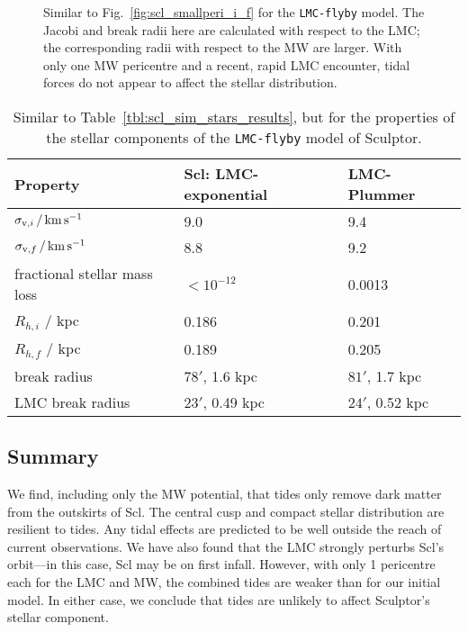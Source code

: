 \begin{figure}
\centering
{}
\caption[Sculptor initial and final density with LMC]{Similar to
Fig.~\ref{fig:scl_smallperi_i_f} for the \texttt{LMC-flyby} model. The
Jacobi and break radii here are calculated with respect to the LMC; the
corresponding radii with respect to the MW are larger. With only one MW
pericentre and a recent, rapid LMC encounter, tidal forces do not appear
to affect the stellar distribution.}\label{fig:scl_lmc_i_f}
\end{figure}

\begin{table*}[t]
\centering
\caption[Simulation results for Sculptor’s stars in the MW+LMC potential]{Similar to Table \ref{tbl:scl_sim_stars_results}, but for the properties of the stellar components of the \texttt{LMC-flyby} model of Sculptor. }
\label{tbl:scl_lmc_sim_stars}
\begin{tabular}{lll}
\toprule
Property & Scl: LMC-exponential & LMC-Plummer\\
\midrule
$\sigma_{{\rm v}, i}\,/\,{\rm km\,s^{-1}}$ & 9.0 & 9.4\\
$\sigma_{{\rm v}, f} \,/\,{\rm km\,s^{-1}}$ & 8.8 & 9.2\\
fractional stellar mass loss & $<10^{-12}$ & 0.0013\\
$R_{h, i}$ / kpc & 0.186 & 0.201\\
$R_{h, f}$ / kpc & 0.189 & 0.205\\
break radius & $78'$, 1.6 kpc & $81'$, 1.7 kpc\\
LMC break radius & $23'$, 0.49 kpc & $24'$, 0.52 kpc\\
\bottomrule
\end{tabular}
\end{table*}

\subsection{Summary}\label{summary}

We find, including only the MW potential, that tides only remove dark
matter from the outskirts of Scl. The central cusp and compact stellar
distribution are resilient to tides. Any tidal effects are predicted to
be well outside the reach of current observations. We have also found
that the LMC strongly perturbs Scl's orbit---in this case, Scl may be on
first infall. However, with only 1 pericentre each for the LMC and MW,
the combined tides are weaker than for our initial model. In either
case, we conclude that tides are unlikely to affect Sculptor's stellar
component.

